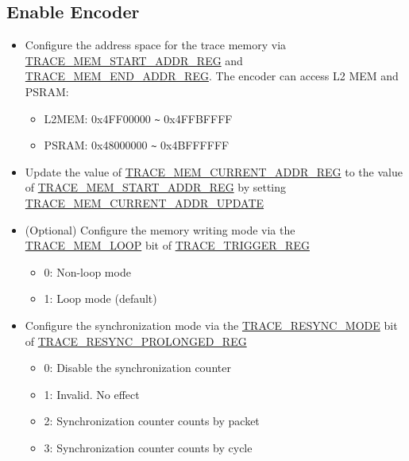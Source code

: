 \documentclass[main\_\_EN.tex]{subfiles}
\begin{document}
\subsection{Enable Encoder}


\begin{itemize}
    \item Configure the address space for the trace memory via \hyperref[regdesc:TRACEMEMSTARTADDRREG]{TRACE\_MEM\_START\_ADDR\_REG} and \hyperref[regdesc:TRACEMEMENDADDRREG]{TRACE\_MEM\_END\_ADDR\_REG}. The encoder can access L2 MEM and PSRAM:
        \begin{itemize}
            \item L2MEM: 0x4FF00000 \verb+~+ 0x4FFBFFFF
            \item PSRAM: 0x48000000 \verb+~+ 0x4BFFFFFF
        \end{itemize}
    \item Update the value of \hyperref[regdesc:TRACEMEMCURRENTADDRREG]{TRACE\_MEM\_CURRENT\_ADDR\_REG} to the value of \hyperref[regdesc:TRACEMEMSTARTADDRREG]{TRACE\_MEM\_START\_ADDR\_REG} by setting \hyperref[fielddesc:TRACEMEMCURRENTADDRUPDATE]{TRACE\_MEM\_CURRENT\_ADDR\_UPDATE}


    \item (Optional) Configure the memory writing mode via the \hyperref[fielddesc:TRACEMEMLOOP]{TRACE\_MEM\_LOOP} bit of \hyperref[regdesc:TRACETRIGGERREG]{TRACE\_TRIGGER\_REG}
        \begin{itemize}
            \item 0: Non-loop mode
            \item 1: Loop mode (default)
        \end{itemize}

    \item Configure the synchronization mode via the \hyperref[fielddesc:TRACERESYNCMODE]{TRACE\_RESYNC\_MODE} bit of \hyperref[regdesc:TRACERESYNCPROLONGEDREG]{TRACE\_RESYNC\_PROLONGED\_REG}
            \begin{itemize}
                    \item 0: Disable the synchronization counter
                    \item 1: Invalid. No effect
                    \item 2: Synchronization counter counts by packet
                    \item 3: Synchronization counter counts by cycle
            \end{itemize}


\end{itemize}
\end{document}
